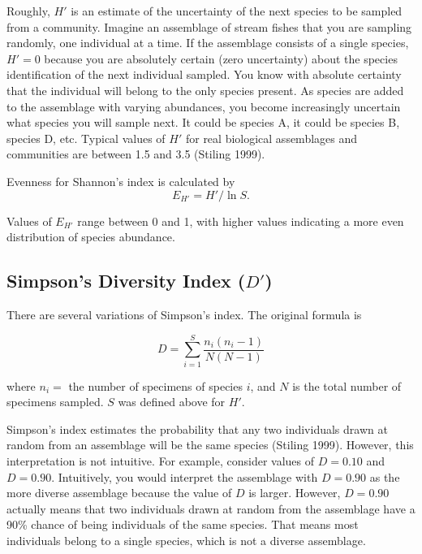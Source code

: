 \documentclass[11pt]{article}
\begin{document}
Roughly, $H'$ is an estimate of the uncertainty of the next species to be sampled from a community.  Imagine an assemblage of stream fishes that you are sampling randomly, one individual at a time.  If the assemblage consists of a single species, $H' = 0$ because you are absolutely certain (zero uncertainty) about the species identification of the next individual sampled.  You know with absolute certainty that the individual will belong to the only species present.  As species are added to the assemblage with varying abundances, you become increasingly uncertain what species you will sample next.  It could be species A, it could be species B, species D, etc.  Typical values of $H'$ for real biological assemblages and communities are between 1.5 and 3.5 (Stiling 1999).

Evenness for Shannon’s index is calculated by
\begin{equation*}
E_{H'} = H'/\ln S.
\end{equation*}

Values of $E_{H' }$ range between 0 and 1, with higher values indicating a more even distribution of species abundance.

\subsection*{Simpson’s Diversity Index ($D'$)}

There are several variations of Simpson’s index.  The original formula is

\begin{equation*}
	D = \sum_{i=1}^{S} \frac{n_i(n_i-1)}{N(N-1)}
\end{equation*}

\noindent where $n_i = $ the number of specimens of species $i$, and $N$ is the total number of specimens sampled. $S$ was defined above for $H'$.

Simpson’s index estimates the probability that any two individuals drawn at random from an assemblage will be the same species (Stiling 1999).  However, this interpretation is not intuitive.  For example, consider values of $D = 0.10$ and $D = 0.90$.  Intuitively, you would interpret the assemblage with $D = 0.90$ as the more diverse assemblage because the value of $D$ is larger.  However, $D = 0.90$ actually means that two individuals drawn at random from the assemblage have a 90\% chance of being individuals of the same species.  That means most individuals belong to a single species, which is not a diverse assemblage.
\end{document}
